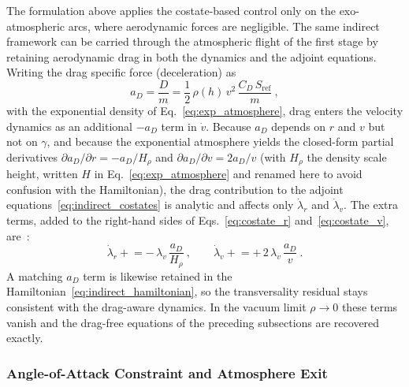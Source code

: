 The formulation above applies the costate-based control only on the exo-atmospheric arcs, where aerodynamic forces are negligible. The same indirect framework can be carried through the atmospheric flight of the first stage by retaining aerodynamic drag in both the dynamics and the adjoint equations. Writing the drag specific force (deceleration) as
\begin{equation}
a_D = \frac{D}{m} = \frac{1}{2}\,\rho(h)\,v^{2}\,\frac{C_D\,S_{\mathrm{ref}}}{m} \ ,
\label{eq:fa_drag}
\end{equation}
with the exponential density of Eq.~\eqref{eq:exp_atmosphere}, drag enters the velocity dynamics as an additional $-a_D$ term in $\dot{v}$. Because $a_D$ depends on $r$ and $v$ but not on $\gamma$, and because the exponential atmosphere yields the closed-form partial derivatives $\partial a_D/\partial r = -a_D/H_\rho$ and $\partial a_D/\partial v = 2a_D/v$ (with $H_\rho$ the density scale height, written $H$ in Eq.~\eqref{eq:exp_atmosphere} and renamed here to avoid confusion with the Hamiltonian), the drag contribution to the adjoint equations~\eqref{eq:indirect_costates} is analytic and affects only $\dot{\lambda}_r$ and $\dot{\lambda}_v$. The extra terms, added to the right-hand sides of Eqs.~\eqref{eq:costate_r} and~\eqref{eq:costate_v}, are~\cite{gath2001optimization}:
\begin{equation}
\dot{\lambda}_r \mathrel{+}= -\,\lambda_v\,\frac{a_D}{H_\rho} \ , \qquad
\dot{\lambda}_v \mathrel{+}= +\,2\,\lambda_v\,\frac{a_D}{v} \ .
\label{eq:fa_drag_adjoint}
\end{equation}
A matching $a_D$ term is likewise retained in the Hamiltonian~\eqref{eq:indirect_hamiltonian}, so the transversality residual stays consistent with the drag-aware dynamics. In the vacuum limit $\rho\to 0$ these terms vanish and the drag-free equations of the preceding subsections are recovered exactly.


\subsubsection{Angle-of-Attack Constraint and Atmosphere Exit}
\label{sssec:fa_alpha}

